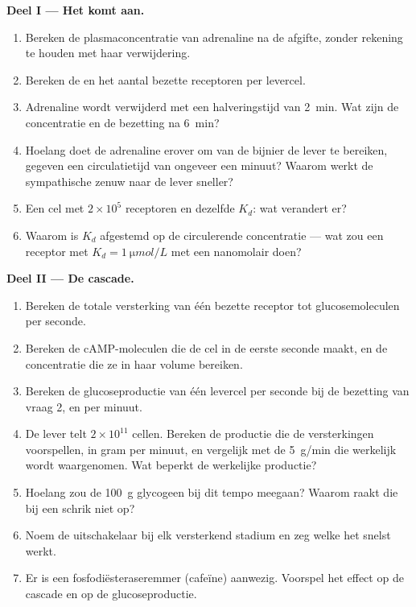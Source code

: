 \begin{problem}
\medskip
\noindent\textbf{Deel I --- Het  komt aan.}
\begin{enumerate}
  \item Bereken de plasmaconcentratie van adrenaline na de afgifte, zonder
        rekening te houden met haar verwijdering.
  \item Bereken de  en het aantal bezette receptoren per
        levercel.
  \item Adrenaline wordt verwijderd met een halveringstijd van
        \qty{2}{min}. Wat zijn de concentratie en de bezetting na
        \qty{6}{min}?
  \item Hoelang doet de adrenaline erover om van de bijnier de lever te
        bereiken, gegeven een circulatietijd van ongeveer een minuut? Waarom
        werkt de sympathische zenuw naar de lever sneller?
  \item Een cel met $2\times 10^{5}$ receptoren en dezelfde $K_d$: wat
        verandert er?
  \item Waarom is $K_d$ afgestemd op de circulerende concentratie --- wat zou
        een receptor met $K_d = \qty{1}{\micro mol/L}$ met een nanomolair
         doen?
\end{enumerate}

\medskip
\noindent\textbf{Deel II --- De cascade.}
\begin{enumerate}[resume]
  \item Bereken de totale versterking van één bezette receptor tot
        glucosemoleculen per seconde.
  \item Bereken de cAMP-moleculen die de cel in de eerste seconde maakt, en
        de concentratie die ze in haar volume bereiken.
  \item Bereken de glucoseproductie van één levercel per seconde bij de
        bezetting van vraag 2, en per minuut.
  \item De lever telt $2\times 10^{11}$ cellen. Bereken de productie die de
        versterkingen voorspellen, in gram per minuut, en vergelijk met de
        \qty{5}{g/min} die werkelijk wordt waargenomen. Wat beperkt de
        werkelijke productie?
  \item Hoelang zou de \qty{100}{g} glycogeen bij dit tempo meegaan? Waarom
        raakt die bij een schrik niet op?
  \item Noem de uitschakelaar bij elk versterkend stadium en zeg welke het
        snelst werkt.
  \item Er is een fosfodiësteraseremmer (cafeïne) aanwezig. Voorspel het
        effect op de cascade en op de glucoseproductie.
\end{enumerate}


\end{problem}
